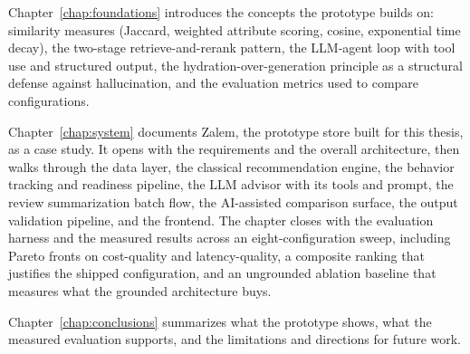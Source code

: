 Chapter~\ref{chap:foundations} introduces the concepts the
prototype builds on: similarity measures (Jaccard, weighted
attribute scoring, cosine, exponential time decay), the two-stage
retrieve-and-rerank pattern, the LLM-agent loop with tool use
and structured output, the hydration-over-generation principle as
a structural defense against hallucination, and the evaluation
metrics used to compare configurations.

Chapter~\ref{chap:system} documents Zalem, the prototype store
built for this thesis, as a case study. It opens with
the requirements and the overall architecture, then walks
through the data layer, the classical recommendation engine, the
behavior tracking and readiness pipeline, the LLM advisor with
its tools and prompt, the review summarization batch flow, the
AI-assisted comparison surface, the output validation pipeline,
and the frontend. The chapter closes with the evaluation harness
and the measured results across an eight-configuration sweep,
including Pareto fronts on cost-quality and latency-quality, a
composite ranking that justifies the shipped configuration, and
an ungrounded ablation baseline that measures what the grounded
architecture buys.

Chapter~\ref{chap:conclusions} summarizes what the prototype
shows, what the measured evaluation supports, and the
limitations and directions for future work.
